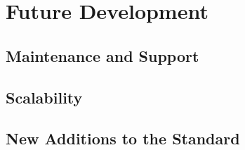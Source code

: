 \chapter{Future Development}
\section{Maintenance and Support}
\section{Scalability}
\section{New Additions to the Standard}